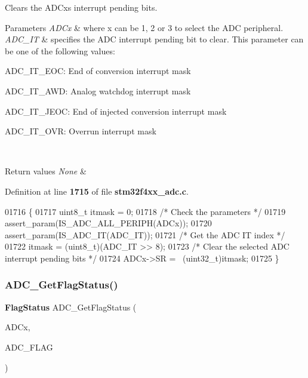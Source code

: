 Clears the A\+D\+Cx\textquotesingle{}s interrupt pending bits. 


\begin{DoxyParams}{Parameters}
{\em A\+D\+Cx} & where x can be 1, 2 or 3 to select the A\+DC peripheral. \\
\hline
{\em A\+D\+C\+\_\+\+IT} & specifies the A\+DC interrupt pending bit to clear. This parameter can be one of the following values\+: \begin{DoxyItemize}
\item A\+D\+C\+\_\+\+I\+T\+\_\+\+E\+OC\+: End of conversion interrupt mask \item A\+D\+C\+\_\+\+I\+T\+\_\+\+A\+WD\+: Analog watchdog interrupt mask \item A\+D\+C\+\_\+\+I\+T\+\_\+\+J\+E\+OC\+: End of injected conversion interrupt mask \item A\+D\+C\+\_\+\+I\+T\+\_\+\+O\+VR\+: Overrun interrupt mask \end{DoxyItemize}
\\
\hline
\end{DoxyParams}

\begin{DoxyRetVals}{Return values}
{\em None} & \\
\hline
\end{DoxyRetVals}


Definition at line \textbf{ 1715} of file \textbf{ stm32f4xx\+\_\+adc.\+c}.


\begin{DoxyCode}
01716 \{
01717   uint8\_t itmask = 0;
01718   \textcolor{comment}{/* Check the parameters */}
01719   assert_param(IS_ADC_ALL_PERIPH(ADCx));
01720   assert_param(IS_ADC_IT(ADC\_IT)); 
01721   \textcolor{comment}{/* Get the ADC IT index */}
01722   itmask = (uint8\_t)(ADC\_IT >> 8);
01723   \textcolor{comment}{/* Clear the selected ADC interrupt pending bits */}
01724   ADCx->SR = ~(uint32\_t)itmask;
01725 \}                    
\end{DoxyCode}
\mbox{\label{group__ADC__Group7_gaa12546e51ec905c90a3aada432bd4633}} 
\subsubsection{A\+D\+C\+\_\+\+Get\+Flag\+Status()}
{\footnotesize\ttfamily \textbf{ Flag\+Status} A\+D\+C\+\_\+\+Get\+Flag\+Status (\begin{DoxyParamCaption}\item[{\textbf{ A\+D\+C\+\_\+\+Type\+Def} $\ast$}]{A\+D\+Cx,  }\item[{uint8\+\_\+t}]{A\+D\+C\+\_\+\+F\+L\+AG }\end{DoxyParamCaption})}



